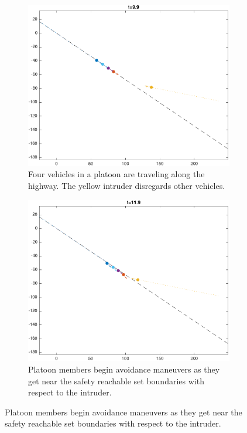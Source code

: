\begin{figure}
    \centering
    \begin{subfigure}[t]{0.45\textwidth} \label{subfig:in_100}
        \includegraphics[width=\textwidth]{fig/in_100}
        \caption{Four vehicles in a platoon are traveling along the highway. The yellow intruder disregards other vehicles.}
    \end{subfigure}
    \begin{subfigure}[t]{0.45\textwidth} \label{subfig:in_120}
        \includegraphics[width=\textwidth]{fig/in_120}
        \caption{Platoon members begin avoidance maneuvers as they get near the safety reachable set boundaries with respect to the intruder.}
    \end{subfigure}


\end{figure}
